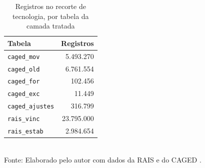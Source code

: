 \begin{table}[htbp]
    \centering
    \caption{Registros no recorte de tecnologia, por tabela da camada tratada}
    \label{tab:linhas-camada}
    \footnotesize
    \renewcommand{\arraystretch}{1.25}
    \begin{tabular}{lr}
        \toprule
        \rowcolor{black!8}
        \textbf{Tabela} & \textbf{Registros} \\
        \midrule
        \texttt{caged\_mov} & 5.493.270 \\
        \texttt{caged\_old} & 6.761.554 \\
        \texttt{caged\_for} & 102.456 \\
        \texttt{caged\_exc} & 11.449 \\
        \texttt{caged\_ajustes} & 316.799 \\
        \texttt{rais\_vinc} & 23.795.000 \\
        \texttt{rais\_estab} & 2.984.654 \\
        \bottomrule
    \end{tabular}
    \\[4pt]
    Fonte: Elaborado pelo autor com dados da RAIS e do CAGED \cite{RAIS2024, CAGED2024}.
\end{table}
